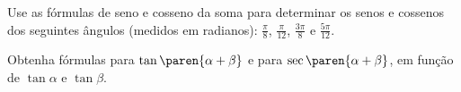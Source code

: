\begin{exercise}
    Use as fórmulas de seno e cosseno da soma para determinar os
senos e cossenos dos seguintes ângulos (medidos em radianos): $\frac
{\pi} 8$, $\frac{\pi} {12}$, $\frac {3\pi} 8$ e $\frac{5\pi}{12}$.
\end{exercise}

\begin{exercise}
    Obtenha fórmulas para $\tan\paren{\alpha + \beta}$ e para
$\sec\paren{\alpha + \beta}$, em função de $\tan \alpha$ e $\tan
\beta$.
\end{exercise}
